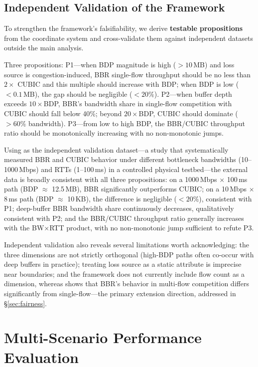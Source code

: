 \documentclass[a4paper,fleqn]{cas-sc}
\begin{document}
\subsection{Independent Validation of the Framework}
\label{sec:framework_valid}

To strengthen the framework's falsifiability, we derive \textbf{testable
propositions} from the coordinate system and cross-validate them against
independent datasets outside the main analysis.

Three propositions: P1---when BDP magnitude is high ($>10$\,MB) and loss source
is congestion-induced, BBR single-flow throughput should be no less than $2\times$
CUBIC and this multiple should increase with BDP; when BDP is low ($<0.1$\,MB),
the gap should be negligible ($<20\%$). P2---when buffer depth exceeds
$10\times$BDP, BBR's bandwidth share in single-flow competition with CUBIC should
fall below 40\%; beyond $20\times$BDP, CUBIC should dominate ($>60\%$ bandwidth).
P3---from low to high BDP, the BBR/CUBIC throughput ratio should be
monotonically increasing with no non-monotonic jumps.

Using \citet{scholz2018deeper} as the independent validation dataset---a study
that systematically measured BBR and CUBIC behavior under different bottleneck
bandwidths (10--1000\,Mbps) and RTTs (1--100\,ms) in a controlled physical
testbed---the external data is broadly consistent with all three propositions: on
a 1000\,Mbps $\times$ 100\,ms path (BDP $\approx$ 12.5\,MB), BBR significantly
outperforms CUBIC; on a 10\,Mbps $\times$ 8\,ms path (BDP $\approx$ 10\,KB),
the difference is negligible ($<20\%$), consistent with P1; deep-buffer BBR
bandwidth share continuously decreases, qualitatively consistent with P2; and the
BBR/CUBIC throughput ratio generally increases with the BW$\times$RTT product,
with no non-monotonic jump sufficient to refute P3.

Independent validation also reveals several limitations worth acknowledging: the
three dimensions are not strictly orthogonal (high-BDP paths often co-occur with
deep buffers in practice); treating loss source as a static attribute is imprecise
near boundaries; and the framework does not currently include flow count as a
dimension, whereas \citet{scholz2018deeper} shows that BBR's behavior in
multi-flow competition differs significantly from single-flow---the primary
extension direction, addressed in \S\ref{sec:fairness}.

\section{Multi-Scenario Performance Evaluation}
\label{sec:comparison}
\end{document}
